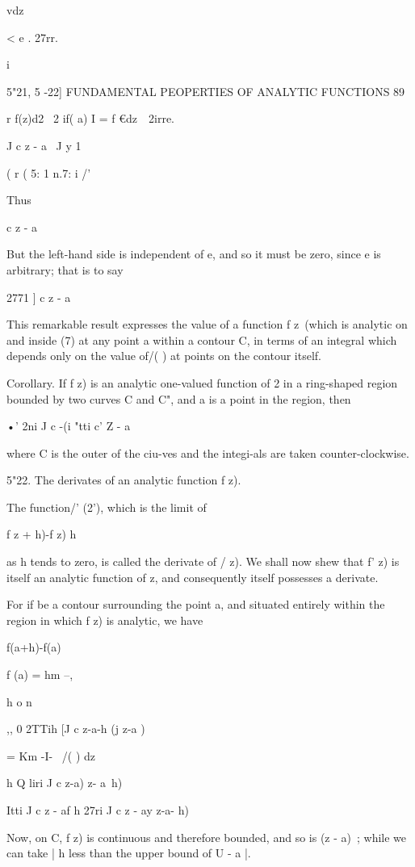 {{vdz

< e . 27rr.

i

5"21, 5 -22] FUNDAMENTAL PEOPERTIES OF ANALYTIC FUNCTIONS 89

r f(z)d2 \ 2 if( a) I = f €dz\ \ 2irre.

J c z - a \ J y 1

( r ( 5: 1 n.7: i /'

Thus

c z - a

But the left-hand side is independent of e, and so it must be zero,
since e is arbitrary; that is to say

    2771 ] c z - a

This remarkable result expresses the value of a function f z\ (which
is analytic on and inside (7) at any point a within a contour C, in
terms of an integral which depends only on the value of/( ) at points
on the contour itself.

Corollary. If f z) is an analytic one-valued function of 2 in a
ring-shaped region bounded by two curves C and C", and a is a point in
the region, then

•' 2ni J c -(i "tti c' Z - a

where C is the outer of the ciu-ves and the integi-als are taken
counter-clockwise.

5"22. The derivates of an analytic function f z).

The function/' (2'), which is the limit of

f z + h)-f z) h

as h tends to zero, is called the derivate of / z). We shall now shew
that f' z) is itself an analytic function of z, and consequently
itself possesses a derivate.

For if be a contour surrounding the point a, and situated entirely
within the region in which f z) is analytic, we have

f(a+h)-f(a)

f (a) = hm --,

h o n

,, 0 2TTih [J c z-a-h (j z-a )

= Km -I- \ /( ) dz

h Q liri J c z-a) z- a~h)

Itti J c z - af h 27ri J c z - ay z-a- h)

Now, on C, f z) is continuous and therefore bounded, and so is (z -
a)~; while we can take | h less than the upper bound of U - a |.

}}
